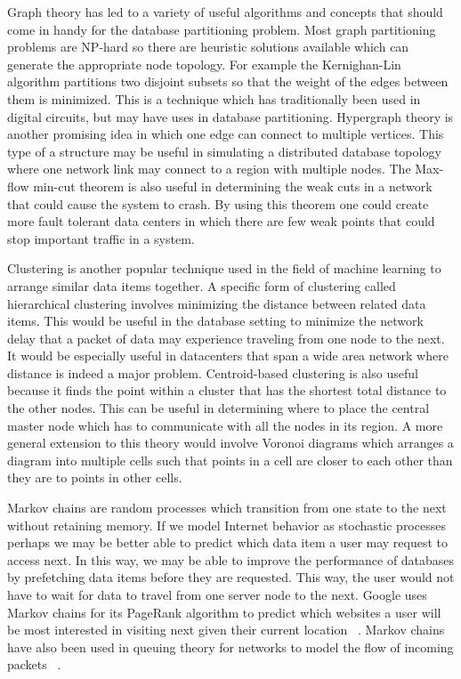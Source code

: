 \documentclass[10pt,final,journal]{IEEEtran}
\begin{document}
Graph theory has led to a variety of useful algorithms and concepts that should come in handy for the database partitioning problem.  Most graph partitioning problems are NP-hard so there are heuristic solutions available which can generate the appropriate node topology.  For example the Kernighan-Lin algorithm partitions two disjoint subsets so that the weight of the edges between them is minimized.  This is a technique which has traditionally been used in digital circuits, but may have uses in database partitioning.  Hypergraph theory is another promising idea in which one edge can connect to multiple vertices.  This type of a structure may be useful in simulating a distributed database topology where one network link may connect to a region with multiple nodes.  The Max-flow min-cut theorem is also useful in determining the weak cuts in a network that could cause the system to crash.  By using this theorem one could create more fault tolerant data centers in which there are few weak points that could stop important traffic in a system.

Clustering is another popular technique used in the field of machine learning to arrange similar data items together.  A specific form of clustering called hierarchical clustering involves minimizing the distance between related data items.  This would be useful in the database setting to minimize the network delay that a packet of data may experience traveling from one node to the next.  It would be especially useful in datacenters that span a wide area network where distance is indeed a major problem.  Centroid-based clustering is also useful because it finds the point within a cluster that has the shortest total distance to the other nodes.  This can be useful in determining where to place the central master node which has to communicate with all the nodes in its region.  A more general extension to this theory would involve Voronoi diagrams which arranges a diagram into multiple cells such that points in a cell are closer to each other than they are to points in other cells.

Markov chains are random processes which transition from one state to the next without retaining memory.  If we model Internet behavior as stochastic processes perhaps we may be better able to predict which data item a user may request to access next.  In this way, we may be able to improve the performance of databases by prefetching data items before they are requested.  This way, the user would not have to wait for data to travel from one server node to the next.  Google uses Markov chains for its PageRank algorithm to predict which websites a user will be most interested in visiting next given their current location ~\cite{Page_1998}.  Markov chains have also been used in queuing theory for networks to model the flow of incoming packets ~\cite{Bose02}.
\end{document}

